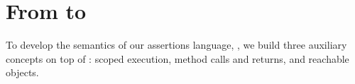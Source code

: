 

\section{From \LangOO to \AssertLang}

{To develop the semantics of our assertions language, \AssertLang, we   build three auxiliary concepts on  top of  \LangOO: scoped execution, method calls and returns, and reachable objects.}

 

